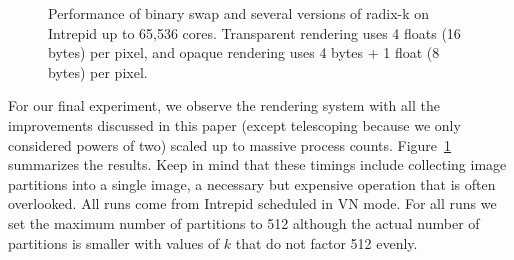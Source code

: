 \documentclass{acm_proc_article-sp}
\begin{document}
\begin{figure}[htbp]
  \centering
  \hfill
  \caption{Performance of binary swap and several versions of radix-k on
    Intrepid up to 65,536 cores.  Transparent rendering uses 4 floats (16
    bytes) per pixel, and opaque rendering uses 4 bytes + 1 float (8 bytes)
    per pixel.}
  \label{fig:Scaling}
\end{figure}

For our final experiment, we observe the rendering system with all the
improvements discussed in this paper (except telescoping because we only
considered powers of two) scaled up to massive process counts.
Figure~\ref{fig:Scaling} summarizes the results.  Keep in mind that these
timings include collecting image partitions into a single image, a
necessary but expensive operation that is often overlooked.  All runs come
from Intrepid scheduled in VN mode.  For all runs we set the maximum number
of partitions to 512 although the actual number of partitions is smaller
with values of $k$ that do not factor 512 evenly.
\end{document}
